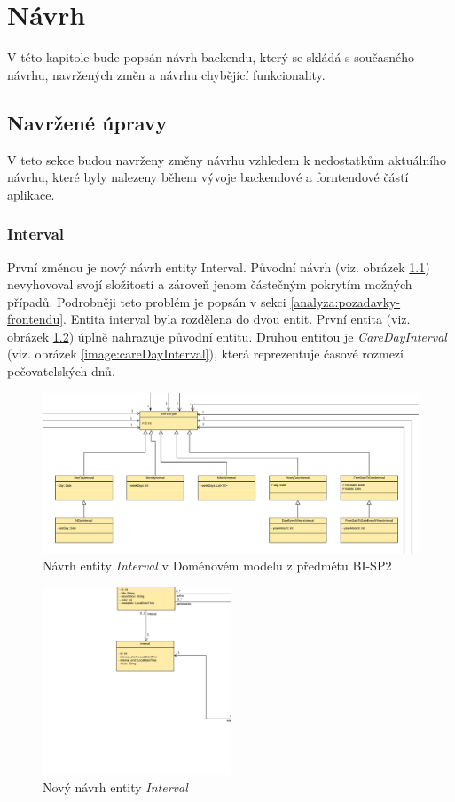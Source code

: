 \chapter{Návrh}
V této kapitole bude popsán návrh backendu, který se skládá s současného návrhu, navržených změn a návrhu chybějící funkcionality.
\section{Navržené úpravy}\label{navrh:upravy}
    V teto sekce budou navrženy změny návrhu vzhledem k nedostatkům aktuálního návrhu, které byly nalezeny během vývoje backendové a forntendové částí aplikace. 
    \subsection{Interval}\label{narh:upravy:interval}
    První změnou je nový návrh entity Interval. Původní návrh (viz. obrázek \ref{image:Interval1}) nevyhovoval svojí složitostí a zároveň jenom částečným pokrytím možných případů. Podrobněji teto problém je popsán v sekci \ref{analyza:pozadavky-frontendu}. Entita interval byla rozdělena do dvou entit. První entita (viz. obrázek \ref{image:Interval2}) úplně nahrazuje původní entitu. Druhou entitou je \textit{CareDayInterval} (viz. obrázek \ref{image:careDayInterval}), která reprezentuje časové rozmezí pečovatelských dnů.
    \begin{figure}\centering
	    \includegraphics[width=1.0\textwidth]{pdfs/Interval1}
	    \caption[Návrh intervalu]{Návrh entity \textit{Interval} v Doménovém modelu z předmětu BI-SP2}\label{image:Interval1}
    \end{figure}
    \begin{figure}\centering
	    \includegraphics[width=0.5\textwidth]{pdfs/Interval2}
	    \caption[Návrh intervalu]{Nový návrh entity \textit{Interval}}\label{image:Interval2}
    \end{figure}
